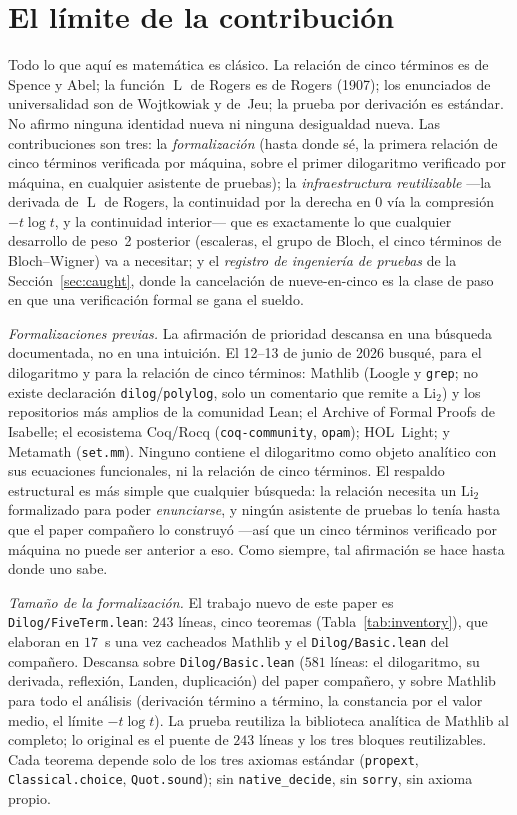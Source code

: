 \documentclass[11pt]{article}
\newcommand{\lean}[1]{\texttt{#1}}
\newcommand{\Li}{\mathrm{Li}_2}
\DeclareMathOperator{\Lrog}{L}
\begin{document}
\section{El l\'imite de la contribuci\'on}\label{sec:boundary}

Todo lo que aqu\'i es matem\'atica es cl\'asico. La relaci\'on de cinco t\'erminos es de
Spence y Abel; la funci\'on $\Lrog$ de Rogers es de Rogers (1907); los enunciados de
universalidad son de Wojtkowiak y de~Jeu; la prueba por derivaci\'on es est\'andar. No afirmo
ninguna identidad nueva ni ninguna desigualdad nueva. Las contribuciones son tres: la
\emph{formalizaci\'on} (hasta donde s\'e, la primera relaci\'on de cinco t\'erminos
verificada por m\'aquina, sobre el primer dilogaritmo verificado por m\'aquina, en cualquier
asistente de pruebas); la \emph{infraestructura reutilizable} ---la derivada de $\Lrog$ de
Rogers, la continuidad por la derecha en $0$ v\'ia la compresi\'on $-t\log t$, y la
continuidad interior--- que es exactamente lo que cualquier desarrollo de peso~2 posterior
(escaleras, el grupo de Bloch, el cinco t\'erminos de Bloch--Wigner) va a necesitar; y el
\emph{registro de ingenier\'ia de pruebas} de la Secci\'on~\ref{sec:caught}, donde la
cancelaci\'on de nueve-en-cinco es la clase de paso en que una verificaci\'on formal se gana
el sueldo.

\emph{Formalizaciones previas.} La afirmaci\'on de prioridad descansa en una b\'usqueda
documentada, no en una intuici\'on. El 12--13 de junio de 2026 busqu\'e, para el dilogaritmo y
para la relaci\'on de cinco t\'erminos: Mathlib (Loogle y \lean{grep}; no existe declaraci\'on
\lean{dilog}/\lean{polylog}, solo un comentario que remite a $\Li$) y los repositorios m\'as
amplios de la comunidad Lean; el Archive of Formal Proofs de Isabelle; el ecosistema Coq/Rocq
(\texttt{coq-community}, \texttt{opam}); HOL~Light; y Metamath (\texttt{set.mm}). Ninguno
contiene el dilogaritmo como objeto anal\'itico con sus ecuaciones funcionales, ni la
relaci\'on de cinco t\'erminos. El respaldo estructural es m\'as simple que cualquier
b\'usqueda: la relaci\'on necesita un $\Li$ formalizado para poder \emph{enunciarse}, y
ning\'un asistente de pruebas lo ten\'ia hasta que el paper compa\~nero lo construy\'o ---as\'i
que un cinco t\'erminos verificado por m\'aquina no puede ser anterior a eso. Como siempre,
tal afirmaci\'on se hace hasta donde uno sabe.

\emph{Tama\~no de la formalizaci\'on.} El trabajo nuevo de este paper es
\lean{Dilog/FiveTerm.lean}: $243$ l\'ineas, cinco teoremas (Tabla~\ref{tab:inventory}), que
elaboran en $17$~s una vez cacheados Mathlib y el \lean{Dilog/Basic.lean} del compa\~nero.
Descansa sobre \lean{Dilog/Basic.lean} ($581$ l\'ineas: el dilogaritmo, su derivada,
reflexi\'on, Landen, duplicaci\'on) del paper compa\~nero, y sobre Mathlib para todo el
an\'alisis (derivaci\'on t\'ermino a t\'ermino, la constancia por el valor medio, el l\'imite
$-t\log t$). La prueba reutiliza la biblioteca anal\'itica de Mathlib al completo; lo original
es el puente de $243$ l\'ineas y los tres bloques reutilizables. Cada teorema depende solo de
los tres axiomas est\'andar (\lean{propext}, \lean{Classical.choice}, \lean{Quot.sound}); sin
\lean{native\_decide}, sin \lean{sorry}, sin axioma propio.
\end{document}
